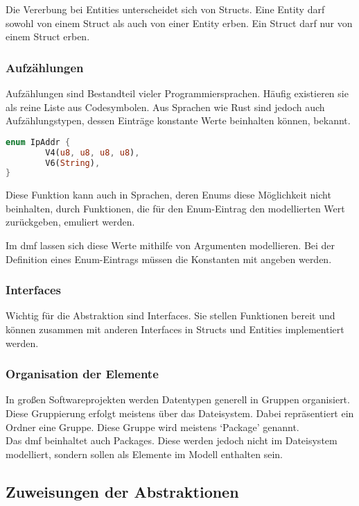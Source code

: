 \documentclass[./einleitung.tex]{subfiles}
\begin{document}
    Die Vererbung bei Entities unterscheidet sich von Structs.
    Eine Entity darf sowohl von einem Struct als auch von einer Entity erben.
    Ein Struct darf nur von einem Struct erben.

    \subsubsection{Aufzählungen}
    Aufzählungen sind Bestandteil vieler Programmiersprachen.
    Häufig existieren sie als reine Liste aus Codesymbolen.
    Aus Sprachen wie Rust sind jedoch auch Aufzählungstypen, dessen Einträge konstante Werte beinhalten können, bekannt.
    \begin{lstlisting}[language=Rust, caption=Ein Enum in Rust aus \citetitle{rustcookbook} \cite{rustcookbook}]
enum IpAddr {
        V4(u8, u8, u8, u8),
        V6(String),
}
    \end{lstlisting}

    Diese Funktion kann auch in Sprachen, deren Enums diese Möglichkeit nicht beinhalten, durch Funktionen, die für den Enum-Eintrag den modellierten Wert zurückgeben, emuliert werden.

    Im \acrshort{dmf} lassen sich diese Werte mithilfe von Argumenten modellieren.
    Bei der Definition eines Enum-Eintrags müssen die Konstanten mit angeben werden.

    \subsubsection{Interfaces}
    Wichtig für die Abstraktion sind Interfaces.
    Sie stellen Funktionen bereit und können zusammen mit anderen Interfaces in Structs und Entities implementiert werden.

    \subsubsection{Organisation der Elemente}
    In großen Softwareprojekten werden Datentypen generell in Gruppen organisiert.
    Diese Gruppierung erfolgt meistens über das Dateisystem.
    Dabei repräsentiert ein Ordner eine Gruppe.
    Diese Gruppe wird meistens `Package' genannt. \\
    Das \acrshort{dmf} beinhaltet auch Packages.
    Diese werden jedoch nicht im Dateisystem modelliert, sondern sollen als Elemente im Modell enthalten sein.

    \subsection{Zuweisungen der Abstraktionen}
\end{document}
